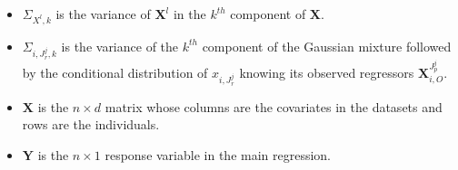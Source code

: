 \documentclass[12pt,a4paper]{report}
\begin{document}
\begin{appendices}
\begin{itemize}
	\item $\Sigma_{X^l,k}$ is the variance of $\boldsymbol{X}^l$ in the $k^{th}$ component of $\boldsymbol{X}$.
	\item $\Sigma_{i,J_r^j,k}$ is the variance of the $k^{th}$ component of the Gaussian mixture followed by the conditional distribution of $x_{i,J_r^j}$ knowing its observed regressors $\boldsymbol{X}_{i,O}^{J_p^j}$.
	\item $\boldsymbol{X}$ is the $n\times d$ matrix whose columns are the covariates in the datasets and rows are the individuals.
	\item $\boldsymbol{Y}$ is the $n\times 1$ response variable in the main regression.
\end{itemize}

	\end{appendices}
\end{document}
